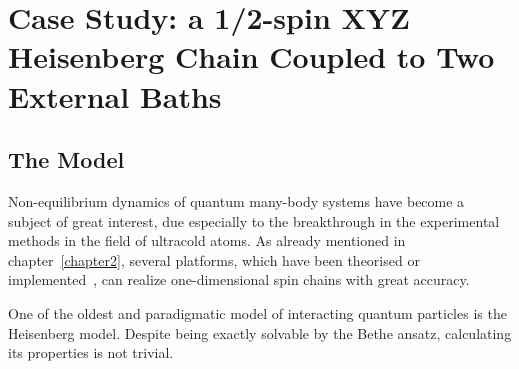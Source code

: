 \chapter{Case Study: a 1/2-spin XYZ Heisenberg Chain Coupled to Two External Baths}
\label{Chapter3}

\section{The Model}
\label{sec:model}
Non-equilibrium dynamics of quantum many-body systems have become a subject of great interest, due especially to the breakthrough in the experimental methods in the field of ultracold atoms. As already mentioned in chapter~\ref{chapter2}, several platforms, which have been theorised or implemented~\cite{exp_spinChain}, can realize one-dimensional spin chains with great accuracy. 

One of the oldest and paradigmatic model of interacting quantum particles is the Heisenberg model. Despite being exactly solvable by the Bethe ansatz, calculating its properties is not trivial. 


